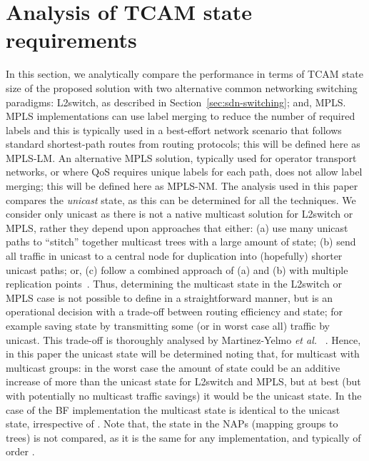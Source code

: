 \documentclass[conference]{IEEEtran}
\begin{document}
\section{Analysis of TCAM state requirements}
\label{sec:algo}

In this section, we analytically compare the performance in terms of  TCAM state size of the proposed solution with two alternative common networking switching paradigms: L2switch, as described in Section~\ref{sec:sdn-switching}; and, MPLS. MPLS implementations can use label merging to reduce the number of required labels and this is typically used in a best-effort network scenario that follows standard shortest-path routes from routing protocols; this will be defined here as MPLS-LM. An alternative MPLS solution, typically used for operator transport networks, or where QoS requires unique labels for each path, does not allow label merging; this will be defined here as MPLS-NM. The analysis used in this paper compares the \emph{unicast} state, as this can be determined for all the techniques. We consider only unicast as there is not a native multicast solution for L2switch or MPLS, rather they depend upon approaches that either: (a) use many unicast paths to ``stitch'' together multicast trees with a large amount of state; (b) send all traffic in unicast to a central node for duplication into (hopefully) shorter unicast paths; or, (c) follow a combined approach of (a) and (b) with multiple replication points~\cite{Rosen12}. Thus, determining the multicast state in the L2switch or MPLS case is not possible to define in a straightforward manner, but is an operational decision with a trade-off between routing efficiency and state; for example saving state by transmitting some (or in worst case all) traffic by unicast. This trade-off is thoroughly analysed by Martinez-Yelmo \emph{et al.} ~\cite{Martinez-Yelmo2007}. Hence, in this paper the unicast state will be determined noting that, for multicast with  multicast groups: in the worst case the amount of state could be an additive increase of  more than the unicast state for L2switch and MPLS, but at best (but with potentially no multicast traffic savings) it would be the unicast state. In the case of the BF implementation the multicast state is identical to the unicast state, irrespective of . Note that, the state in the NAPs (mapping groups to trees) is not compared, as it is the same for any implementation, and typically of order .
\end{document}
